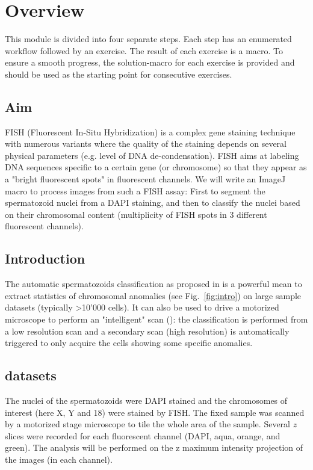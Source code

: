 \section{Overview}

This module is divided into four separate steps. Each step has an enumerated workflow followed by an exercise. The result of each exercise is a macro. To ensure a smooth progress, the solution-macro for each exercise is provided and should be used as the starting point for consecutive exercises.

\subsection{Aim}

FISH (Fluorescent In-Situ Hybridization) is a complex gene staining technique with numerous variants \cite{volpi2008fish} where the quality of the staining depends on several physical parameters (e.g. level of DNA de-condensation). FISH aims at labeling DNA sequences specific to a certain gene (or chromosome) so that they appear as a "bright fluorescent spots" in fluorescent channels. We will write an ImageJ macro to process images from such a FISH assay: First to segment the spermatozoid nuclei from a DAPI staining, and then to classify the nuclei based on their chromosomal content (multiplicity of FISH spots in 3 different fluorescent channels).

\subsection{Introduction}

The automatic spermatozoids classification as proposed in \cite{molina2009fish} is a powerful mean to extract statistics of chromosomal anomalies (see Fig.~\ref{fig:intro}) on large sample datasets (typically >10'000 cells). It can also be used to drive a motorized microscope to perform an "intelligent" scan (\cite{tosi2012}): the classification is performed from a low resolution scan and a secondary scan (high resolution) is automatically triggered to only acquire the cells showing some specific anomalies.

\subsection{datasets}
The nuclei of the spermatozoids were DAPI stained and the chromosomes of interest (here X, Y and 18) were  stained by FISH. The fixed sample was scanned by a motorized stage microscope to tile the whole area of the sample. Several $z$ slices were recorded for each fluorescent channel (DAPI, aqua, orange, and green). The analysis will be performed on the z maximum intensity projection of the images (in each channel).
